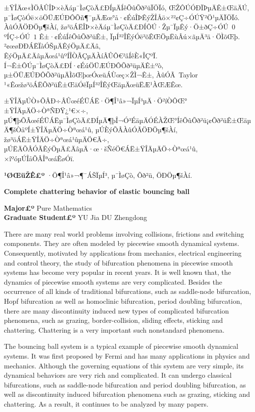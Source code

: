 \documentclass[12pt,openany,CJK,oneside]{cctbook}
\begin{document}
±ŸÎÄœ«ÌÖÂÛÎÞ×èÄáµ¯ÌøÇòÄ£ÐÍµÄÍêÕûÕð²üÏÖÏó, ŒŽÔÚÓÐÏÞµÄÊ±ŒäÄÚ, µ¯ÌøÇòÓë×öÖÜÆÚÐÔÕñ¶¯µÄÆœ°å·¢ÉúÎÞÊýŽÎÅö×²²¢Ç÷ÓÚŸ²Ö¹µÄÏÖÏó. ÀûÓÃÖÐÖµ¶šÀí, žø³öÁËÎÞ×èÄáµ¯ÌøÇòÄ£ÐÍÔÚ·Žµ¯ÏµÊý·Ö±ðÇ÷ÓÚ\ $0$ ºÍÇ÷ÓÚ\ $1$ Ê±·¢ÉúÍêÕûÕð²üÊ±, ÏµÍ³²ÎÊýÓë³õÊŒÖµËùÂú×ãµÄ³ä·ÖÌõŒþ. ²¢œøÐÐÁËÏàÓŠµÄÊýÖµÄ£Äâ, ÊýÖµÄ£ÄâµÄœá¹ûºÍÎÒÃÇµÄÀíÂÛÔ€²âÍêÈ«ÎÇºÏ. Í¬Ê±ÔÚµ¯ÌøÇòÄ£ÐÍ·¢ÉúÖÜÆÚÐÔÕð²üµÄÊ±ºò, µ±ÖÜÆÚÐÔÕð²üµÄÌõŒþœÓœüÁÙœç×ŽÌ¬Ê±, ÀûÓÃ\ Taylor ¹«Êœžø³öÁËÕð²üÊ±ŒäÓëÏµÍ³²ÎÊýŒäµÄœüËÆ¹ÀŒÆÊœ.

±ŸÎÄµÚÒ»ÕÂÐ÷ÂÛœéÉÜÁË·Ö¶Î¹â»¬ÏµÍ³µÄ·Ö²íÒÔŒ°±ŸÎÄµÄÖ÷ÒªÑÐŸ¿¹€×÷, µÚ¶þÕÂœéÉÜÁËµ¯ÌøÇòÄ£ÐÍµÄ¶þÎ¬Ó³ÉäµÄÓÉÀŽŒ°ÍêÕûÕð²ü¡¢Õð²üÊ±ŒäµÄ¶šÒåºÍ±ŸÎÄµÄÖ÷Òªœá¹û, µÚÈýÕÂÀûÓÃÖÐÖµ¶šÀí, žø³öÁË±ŸÎÄÖ÷Òªœá¹ûµÄÖ€Ã÷, µÚËÄÕÂÓÃÊýÖµÄ£ÄâµÄ·œ·šÑéÖ€ÁË±ŸÎÄµÄÖ÷Òªœá¹û, ×îºóµÚÎåÕÂÎªœáÊøÓï.


{\bf ¹ØŒüŽÊ£º} {·Ö¶Î¹â»¬¶¯ÁŠÏµÍ³, µ¯ÌøÇò, Õð²ü, ÖÐÖµ¶šÀí.}
\newpage
\parskip 10pt
\baselineskip 20pt \thispagestyle{empty} \vspace*{0.2cm}
\begin{center}{\bf \Large Complete chattering behavior of elastic bouncing ball}

\vspace{0.2cm} {\small
{\bf Major£º} Pure Mathematics\\
\vspace{0.2cm} {\bf Graduate Student£º} YU Jia   DU Zhengdong} \end{center} \vspace{0.4cm}

There are many real world problems involving collisions, frictions and switching components. They are often modeled by piecewise smooth dynamical systems. Consequently, motivated by applications from mechanics, electrical engineering and control theory, the study of bifurcation phenomena in piecewise smooth systems has become very popular in recent years. It is well known that, the dynamics of piecewise smooth systems are very complicated. Besides the occurrence of all kinds of traditional bifurcations, such as saddle-node bifurcation, Hopf bifurcation as well as homoclinic bifurcation, period doubling bifurcation, there are many discontinuity induced new types of complicated bifurcation phenomena, such as grazing, border-collision, sliding effects, sticking and chattering. Chattering is a very important such nonstandard phenomena.

The bouncing ball system is a typical example of piecewise smooth dynamical systems. It was first proposed by Fermi and has many applications in physics and mechanics. Although the governing equations of this system are very simple, its dynamical behaviors are very rich and complicated. It can undergo classical bifurcations, such as saddle-node bifurcation and period doubling bifurcation, as well as discontinuity induced bifurcation phenomena such as grazing, sticking and chattering. As a result, it continues to be analyzed by many papers.
\end{document}
